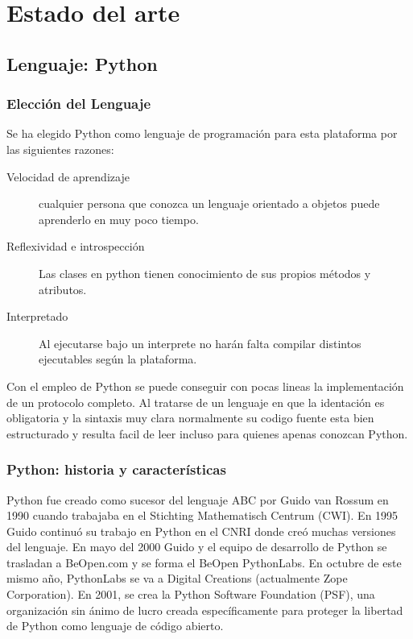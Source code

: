 \documentclass[a4paper,spanish,12pt]{book}
\begin{document}
\chapter{Estado del arte}

\section{Lenguaje: Python}
\subsection{Elecci\'on del Lenguaje} 
Se ha elegido Python como lenguaje de programaci\'on para esta plataforma por las siguientes razones:
\begin{description}
	\item[Velocidad de aprendizaje] cualquier persona que conozca un lenguaje orientado a objetos puede aprenderlo en muy poco tiempo.
	\item[Reflexividad e introspección] Las clases en python tienen conocimiento de sus propios m\'etodos y atributos.
	\item[Interpretado] Al ejecutarse bajo un interprete no har\'an falta compilar distintos ejecutables seg\'un la plataforma.
\end{description}

Con el empleo de Python se puede conseguir con pocas lineas la implementaci\'on de un protocolo completo. Al tratarse de un lenguaje en que la identaci\'on es obligatoria y la sintaxis muy clara normalmente su codigo fuente esta bien estructurado y resulta facil de leer incluso para quienes apenas conozcan Python.

\subsection{Python: historia y características}

Python fue creado como sucesor del lenguaje ABC por Guido van Rossum en 1990 cuando trabajaba en el Stichting Mathematisch Centrum (CWI). En 1995 Guido continuó su trabajo en Python en el CNRI donde creó muchas versiones del lenguaje. En mayo del 2000 Guido y el equipo de desarrollo de Python se trasladan a BeOpen.com y se forma el BeOpen PythonLabs. En octubre de este mismo año, PythonLabs se va a Digital Creations (actualmente Zope Corporation). En 2001, se crea la Python Software Foundation (PSF), una organización sin ánimo de lucro creada específicamente para proteger la libertad de Python como lenguaje de código abierto.
\end{document}
